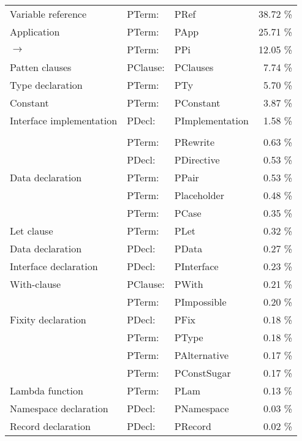 \documentclass[parskip=half]{scrartcl}
\begin{document}
\begin{center}
  \begin{tabular}{ l l l r }
    Variable reference       & PTerm:   &    PRef            &    38.72 \% \\
    Application              & PTerm:   &    PApp            &    25.71 \% \\
    $\rightarrow$            & PTerm:   &    PPi             &    12.05 \% \\
    Patten clauses           & PClause: &    PClauses        &    7.74  \% \\
    Type declaration         & PTerm:   &    PTy             &    5.70  \% \\
    Constant                 & PTerm:   &    PConstant       &    3.87  \% \\
    Interface implementation & PDecl:   &    PImplementation &    1.58  \% \\
    \\
                             & PTerm:   &    PRewrite        &    0.63  \% \\
                             & PDecl:   &    PDirective      &    0.53  \% \\
    Data declaration         & PTerm:   &    PPair           &    0.53  \% \\
                             & PTerm:   &    Placeholder     &    0.48  \% \\
                             & PTerm:   &    PCase           &    0.35  \% \\
    Let clause               & PTerm:   &    PLet            &    0.32  \% \\
    Data declaration         & PDecl:   &    PData           &    0.27  \% \\
    Interface declaration    & PDecl:   &    PInterface      &    0.23  \% \\
    With-clause              & PClause: &    PWith           &    0.21  \% \\
                             & PTerm:   &    PImpossible     &    0.20  \% \\
    Fixity declaration       & PDecl:   &    PFix            &    0.18  \% \\
                             & PTerm:   &    PType           &    0.18  \% \\
                             & PTerm:   &    PAlternative    &    0.17  \% \\
                             & PTerm:   &    PConstSugar     &    0.17  \% \\
    Lambda function          & PTerm:   &    PLam            &    0.13  \% \\
    Namespace declaration    & PDecl:   &    PNamespace      &    0.03  \% \\
    Record declaration       & PDecl:   &    PRecord         &    0.02  \% \\

  \end{tabular}
\end{center}
\end{document}
